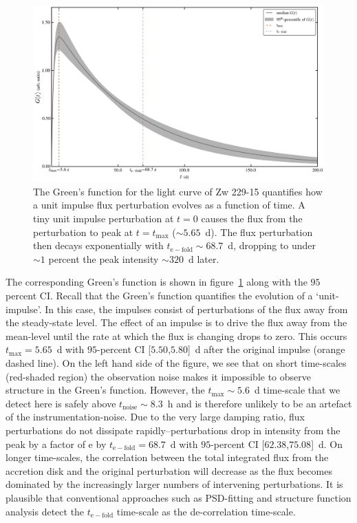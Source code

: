 \documentclass[a4paper,fleqn,usenatbib]{mnras}
\begin{document}
\begin{figure}
    \includegraphics[width=\textwidth]{images/Zw229-15_GF.jpg}
    \caption{The Green's function for the light curve of Zw 229-15 quantifies how a unit impulse flux perturbation evolves as a function of time. A tiny unit impulse perturbation at $t = 0$ causes the flux from the perturbation to peak at $t = t_{\mathrm{max}}$ ($\sim 5.65$~d). The flux perturbation then decays exponentially with $t_{\mathrm{e-fold}} \sim 68.7$~d, dropping to under $\sim 1$ percent the peak intensity $\sim 320$~d later.}
    \label{fig:Zw229-15_GFunc}
\end{figure}

The corresponding Green's function is shown in figure~\ref{fig:Zw229-15_GFunc} along with the $95$ percent CI. Recall that the Green's function quantifies the evolution of a `unit-impulse'. In this case, the impulses consist of perturbations of the flux away from the steady-state level. The effect of an impulse is to drive the flux away from the mean-level until the rate at which the flux is changing drops to zero. This occurs $t_{\mathrm{max}} = 5.65$~d with $95$-percent CI [$5.50$,$5.80$]~d after the original impulse (orange dashed line). On the left hand side of the figure, we see that on short time-scales (red-shaded region) the observation noise makes it impossible to observe structure in the Green's function. However, the $t_{\mathrm{max}} \sim 5.6$~d time-scale that we detect here is safely above $t_{\mathrm{noise}} \sim 8.3$~h and is therefore unlikely to be an artefact of the instrumentation-noise. Due to the very large damping ratio, flux perturbations do not dissipate rapidly--perturbations drop in intensity from the peak by a factor of $\mathrm{e}$ by $t_{\mathrm{e-fold}} = 68.7$~d with $95$-percent CI [$62.38$,$75.08$]~d. On longer time-scales, the correlation between the total integrated flux from the accretion disk and the original perturbation will decrease as the flux becomes dominated by the increasingly larger numbers of intervening perturbations. It is plausible that conventional approaches such as PSD-fitting and structure function analysis detect the $t_{\mathrm{e-fold}}$ time-scale as the de-correlation time-scale. 
\end{document}
